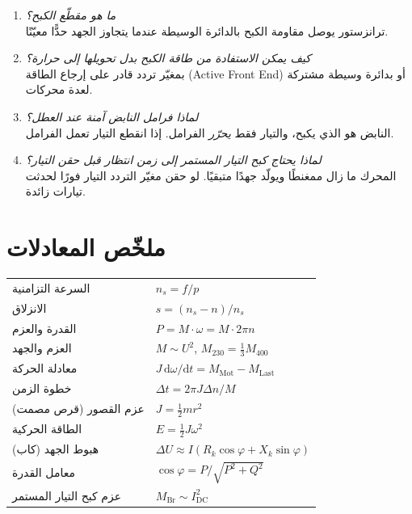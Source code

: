 \documentclass[11pt,a4paper]{article}
\newcommand{\dt}[1]{\textgerman{#1}}
\begin{document}
\begin{enumerate}[label=\textbf{س\arabic*:},leftmargin=2.4em]
  الطاقة تذهب إلى المكثّف، ومقوّم الدايودات لا يستطيع إرجاعها إلى الشبكة.
\item \emph{ما هو مقطّع الكبح؟}\\
  ترانزستور يوصل مقاومة الكبح بالدائرة الوسيطة عندما يتجاوز الجهد حدًّا معيّنًا.
\item \emph{كيف يمكن الاستفادة من طاقة الكبح بدل تحويلها إلى حرارة؟}\\
  بمغيّر تردد قادر على إرجاع الطاقة \dt{(Active Front End)} أو بدائرة وسيطة مشتركة لعدة محركات.
\item \emph{لماذا فرامل النابض آمنة عند العطل؟}\\
  النابض هو الذي يكبح، والتيار فقط \emph{يحرّر} الفرامل. إذا انقطع التيار تعمل الفرامل.
\item \emph{لماذا يحتاج كبح التيار المستمر إلى زمن انتظار قبل حقن التيار؟}\\
  المحرك ما زال ممغنطًا ويولّد جهدًا متبقيًا. لو حقن مغيّر التردد التيار فورًا لحدثت تيارات زائدة.
\end{enumerate}

\section{ملخّص المعادلات}
\begin{center}
\renewcommand{\arraystretch}{1.5}
\begin{tabular}{@{}ll@{}}
\toprule
السرعة التزامنية & $n_s = f/p$\\
الانزلاق & $s = (n_s-n)/n_s$\\
القدرة والعزم & $P = M\cdot\omega = M\cdot2\pi n$\\
العزم والجهد & $M\sim U^2$, \quad $M_{230} = \frac13M_{400}$\\
معادلة الحركة & $J\,\mathrm d\omega/\mathrm dt = M_\mathrm{Mot} - M_\mathrm{Last}$\\
خطوة الزمن & $\Delta t = 2\pi J\Delta n/M$\\
عزم القصور (قرص مصمت) & $J = \frac12 m r^2$\\
الطاقة الحركية & $E = \frac12 J\omega^2$\\
هبوط الجهد (كاب) & $\Delta U\approx I(R_k\cos\varphi + X_k\sin\varphi)$\\
معامل القدرة & $\cos\varphi = P/\sqrt{P^2+Q^2}$\\
عزم كبح التيار المستمر & $M_\mathrm{Br}\sim I_\mathrm{DC}^2$\\
\bottomrule
\end{tabular}
\end{center}
\end{document}
